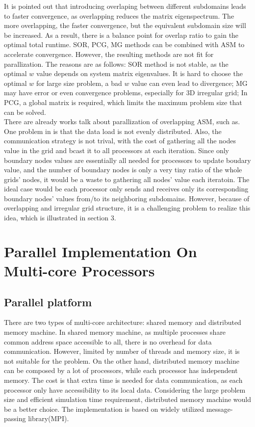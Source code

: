 \documentclass{sig-alternate}
\begin{document}
	It is pointed out that introducing overlaping between different subdomains leads to faster convergence, 
	as overlapping reduces the matrix eigenspectrum\cite{Klawonn}\cite{Taopeng}. The more overlapping, the faster convergence,
	but the equivalent subdomain size will  be increased. As a result, there is a balance point for overlap ratio to gain the 
	optimal total runtime. SOR, PCG, MG methods can be combined with ASM to accelerate convergence. However, the resulting methods
	are not fit for parallization. The reasons are as follows: SOR method is not 
	stable, as the optimal $w$ value depends on system matrix eigenvalues. It is hard to choose the optimal $w$ for large
	size problem, a bad $w$ value can even lead to divergence; MG may have
	error or even convergence problems, especially for 3D irregular grid; In PCG, a global
	matrix is required, which limits the maximum problem size that can be solved.\\ 
	 
	There are already works talk about parallization of overlapping ASM, such as\cite{kaisun}. One problem in \cite{kaisun} is 
	that the
	data load is not evenly distributed. Also, the communication strategy is not trival, with the cost of gathering all the
	nodes value in the grid and bcast it to all processors at each iteration. Since only boundary nodes values are essentially all 
	needed for processors to update boudary value, and the number of boundary nodes is only a very tiny ratio of the whole grids' 
	nodes, it would be a waste to gathering all nodes' value each iteratoin. The ideal case would be 
	each processor only sends and receives only its corresponding boundary nodes' values from/to its neighboring subdomains. 
	However, because of overlapping and irregular grid structure, it is a challenging problem to realize this idea, which is
	illustrated in section 3.\\
 
\section{Parallel Implementation On \\Multi-core Processors}
  \subsection{Parallel platform}
	There are two types of multi-core architecture: shared memory and distributed memory machine. In shared memory machine, as 
	multiple processes share common address space accessible to all, there is no overhead for data communication. However, limited
	by number of threads and memory size, it is not suitable for the problem. On the other hand, distributed 
	memory machine can be composed by a lot of processors, while each processor has independent memory. The cost is that extra time 
	is needed for data communication, as each processor only have accessibility to its local data. Considering the large problem 
	size and efficient simulation time requirement, distributed memory machine would be a better choice. The implementation is based
	on widely utilized message-passing library(MPI).
\end{document}
